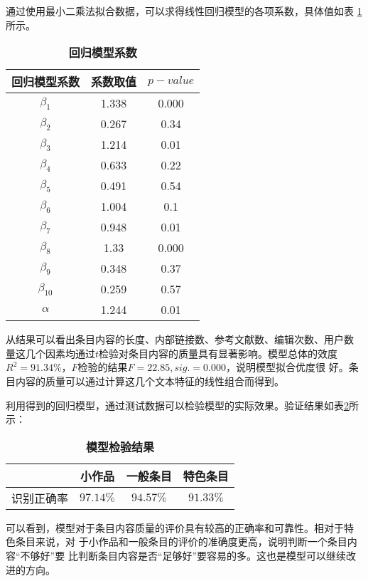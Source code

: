 
通过使用最小二乘法拟合数据，可以求得线性回归模型的各项系数，具体值如表
\ref{tab:coefficient}所示。
\begin{table}[!htb]
  \centering
\caption{\small{\bf{回归模型系数}}}
 \small
  \begin{tabular}{|c|c|c|}
\hline
    回归模型系数&系数取值&$p-value$\\\hline
     $\beta_1$&1.338&0.000\\\hline
$\beta_2$&0.267&0.34\\\hline
$\beta_3$&1.214&0.01\\\hline
$\beta_4$&0.633&0.22\\\hline
$\beta_5$&0.491&0.54\\\hline
$\beta_6$&1.004&0.1\\\hline
$\beta_7$&0.948&0.01\\\hline
$\beta_8$&1.33&0.000\\\hline
$\beta_9$&0.348&0.37\\\hline
$\beta_{10}$&0.259&0.57\\\hline
$\alpha$&1.244&0.01\\\hline
  \end{tabular}
  
  \label{tab:coefficient}
\end{table}

从结果可以看出条目内容的长度、内部链接数、参考文献数、编辑次数、用户数
量这几个因素均通过$t$检验对条目内容的质量具有显著影响。模型总体的效度
$R^2=91.34\%$，$F$检验的结果$F=22.85, sig.=0.000$，说明模型拟合优度很
好。条目内容的质量可以通过计算这几个文本特征的线性组合而得到。

利用得到的回归模型，通过测试数据可以检验模型的实际效果。验证结果如表\ref{tab:model-test}所
示：
\begin{table}[!htb]
  \centering
\small
\caption{\small{\bf{模型检验结果}}} 
 \begin{tabular}{|c|c|c|c|}
 \hline
    &小作品&一般条目&特色条目\\\hline
识别正确率&$97.14\%$&$94.57\%$&$91.33\%$\\\hline
  \end{tabular}
  
  \label{tab:model-test}
\end{table}
可以看到，模型对于条目内容质量的评价具有较高的正确率和可靠性。相对于特
色条目来说，对
于小作品和一般条目的评价的准确度更高，说明判断一个条目内容“不够好”要
比判断条目内容是否“足够好”要容易的多。这也是模型可以继续改进的方向。

